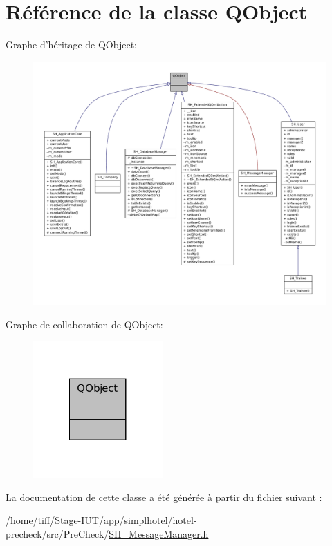 \hypertarget{classQObject}{\section{Référence de la classe Q\-Object}
\label{classQObject}
}


Graphe d'héritage de Q\-Object\-:
\nopagebreak
\begin{figure}[H]
\begin{center}
\leavevmode
\includegraphics[width=350pt]{classQObject__inherit__graph}
\end{center}
\end{figure}


Graphe de collaboration de Q\-Object\-:\nopagebreak
\begin{figure}[H]
\begin{center}
\leavevmode
\includegraphics[width=140pt]{classQObject__coll__graph}
\end{center}
\end{figure}


La documentation de cette classe a été générée à partir du fichier suivant \-:\begin{DoxyCompactItemize}
\item 
/home/tiff/\-Stage-\/\-I\-U\-T/app/simplhotel/hotel-\/precheck/src/\-Pre\-Check/\hyperlink{SH__MessageManager_8h}{S\-H\-\_\-\-Message\-Manager.\-h}\end{DoxyCompactItemize}
